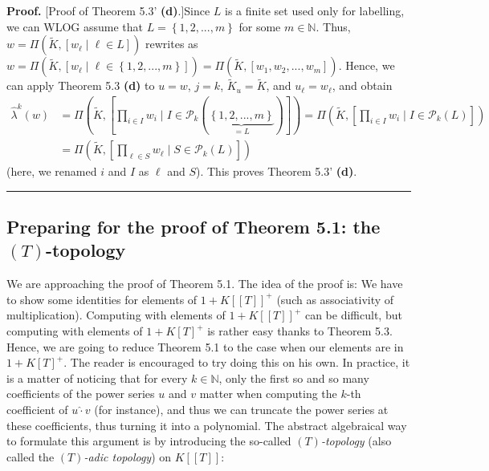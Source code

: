 \documentclass[numbers=enddot,12pt,final,onecolumn,notitlepage]{scrartcl}%
\newenvironment{proof}[1][Proof]{\noindent\textbf{#1.} }{\ \rule{0.5em}{0.5em}}
\begin{document}
\begin{proof}
[Proof of Theorem 5.3' \textbf{(d)}.]Since $L$ is a finite set used only for
labelling, we can WLOG assume that $L=\left\{  1,2,...,m\right\}  $ for some
$m\in\mathbb{N}$. Thus, $w=\Pi\left(  \widetilde{K},\left[  w_{\ell}\mid
\ell\in L\right]  \right)  $ rewrites as $w=\Pi\left(  \widetilde{K},\left[
w_{\ell}\mid\ell\in\left\{  1,2,...,m\right\}  \right]  \right)  =\Pi\left(
\widetilde{K},\left[  w_{1},w_{2},...,w_{m}\right]  \right)  $. Hence, we can
apply Theorem 5.3 \textbf{(d)} to $u=w$, $j=k$, $\widetilde{K}_{u}%
=\widetilde{K}$, and $u_{\ell}=w_{\ell}$, and obtain%
\begin{align*}
\widehat{\lambda}^{k}\left(  w\right)   &  =\Pi\left(  \widetilde{K},\left[
\prod_{i\in I}w_{i}\mid I\in\mathcal{P}_{k}\left(  \underbrace{\left\{
1,2,...,m\right\}  }_{=L}\right)  \right]  \right)  =\Pi\left(  \widetilde{K}%
,\left[  \prod_{i\in I}w_{i}\mid I\in\mathcal{P}_{k}\left(  L\right)  \right]
\right) \\
&  =\Pi\left(  \widetilde{K},\left[  \prod_{\ell\in S}w_{\ell}\mid
S\in\mathcal{P}_{k}\left(  L\right)  \right]  \right)
\end{align*}
(here, we renamed $i$ and $I$ as $\ell$ and $S$). This proves Theorem 5.3'
\textbf{(d)}.
\end{proof}

\subsection{Preparing for the proof of Theorem 5.1: the $\left(  T\right)
$-topology}

We are approaching the proof of Theorem 5.1. The idea of the proof is: We have
to show some identities for elements of $1+K\left[  \left[  T\right]  \right]
^{+}$ (such as associativity of multiplication). Computing with elements of
$1+K\left[  \left[  T\right]  \right]  ^{+}$ can be difficult, but computing
with elements of $1+K\left[  T\right]  ^{+}$ is rather easy thanks to Theorem
5.3. Hence, we are going to reduce Theorem 5.1 to the case when our elements
are in $1+K\left[  T\right]  ^{+}$. The reader is encouraged to try doing this
on his own. In practice, it is a matter of noticing that for every
$k\in\mathbb{N}$, only the first so and so many coefficients of the power
series $u$ and $v$ matter when computing the $k$-th coefficient of
$u\widehat{\cdot}v$ (for instance), and thus we can truncate the power series
at these coefficients, thus turning it into a polynomial. The abstract
algebraical way to formulate this argument is by introducing the so-called
$\left(  T\right)  $\textit{-topology} (also called the $\left(  T\right)
$\textit{-adic topology}) on $K\left[  \left[  T\right]  \right]  $:
\end{document}
